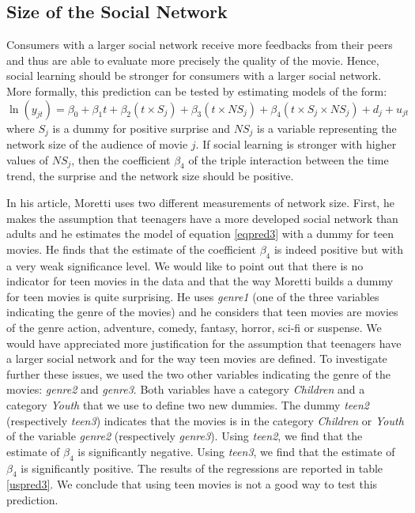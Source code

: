 \subsection{Size of the Social Network}\label{subsec2.4}

Consumers with a larger social network receive more feedbacks from their peers and thus are able to evaluate more precisely the quality of the movie.
Hence, social learning should be stronger for consumers with a larger social network.
More formally, this prediction can be tested by estimating models of the form:
\begin{equation}
	\ln (y_{jt})  = \beta_0 + \beta_1 t + \beta_2 (t \times S_j) + \beta_3 (t \times NS_j) + \beta_4 (t \times S_j \times NS_j) + d_j + u_{jt}
	\label{eqpred3}
\end{equation}
where $S_j$ is a dummy for positive surprise and $NS_j$ is a variable representing the network size of the audience of movie $j$.
If social learning is stronger with higher values of $NS_j$, then the coefficient $\beta_4$ of the triple interaction between the time trend, the surprise and the network size should be positive.

In his article, Moretti uses two different measurements of network size.
First, he makes the assumption that teenagers have a more developed social network than adults and he estimates the model of equation \ref{eqpred3} with a dummy for teen movies.
He finds that the estimate of the coefficient $\beta_4$ is indeed positive but with a very weak significance level.
We would like to point out that there is no indicator for teen movies in the data and that the way Moretti builds a dummy for teen movies is quite surprising.
He uses \textit{genre1} (one of the three variables indicating the genre of the movies) and he considers that teen movies are movies of the genre action, adventure, comedy, fantasy, horror, sci-fi or suspense.
We would have appreciated more justification for the assumption that teenagers have a larger social network and for the way teen movies are defined.
To investigate further these issues, we used the two other variables indicating the genre of the movies: \textit{genre2} and \textit{genre3}.
Both variables have a category \textit{Children} and a category \textit{Youth} that we use to define two new dummies.
The dummy \textit{teen2} (respectively \textit{teen3}) indicates that the movies is in the category \textit{Children} or \textit{Youth} of the variable \textit{genre2} (respectively \textit{genre3}).
Using \textit{teen2}, we find that the estimate of $\beta_4$ is significantly negative.
Using \textit{teen3}, we find that the estimate of $\beta_4$ is significantly positive.
The results of the regressions are reported in table \ref{uspred3}.
We conclude that using teen movies is not a good way to test this prediction.

